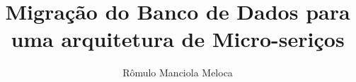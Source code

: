 \documentclass[12pt,english,brazil,a4paper,utf8,oneside]{utfpr-tcc}
\author{Rômulo Manciola Meloca}  %
\title{Migração do Banco de Dados para uma arquitetura de Micro-seriços} %
\begin{document}
	
\frontmatter
\maketitle

\begin{resumo}

\palavraschaves{}
\end{resumo}







\listoffigures
\listoftables

\tableofcontents

\mainmatter

% 
% 
% 



\backmatter
\end{document}
